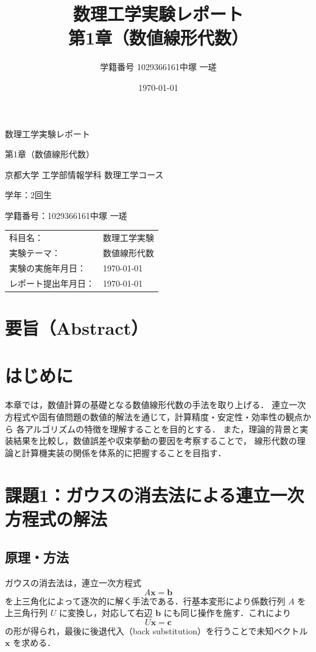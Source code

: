 \documentclass[a4paper,11pt]{ltjsarticle}
\title{数理工学実験レポート\\\vspace{5pt}\large 第1章（数値線形代数）}
\author{学籍番号 1029366161\quad 中塚 一瑳}
\date{\today}
\begin{document}
\begin{titlepage}
\centering
{\Large 数理工学実験レポート\par}
\vspace{4mm}
{\large 第1章（数値線形代数）\par}
\vspace{15mm}
{\large 京都大学 工学部情報学科 数理工学コース\par}
{\large 学年：2回生\par}
{\large 学籍番号：1029366161\quad 中塚 一瑳\par}
\vspace{10mm}
\begin{tabular}{@{}ll}
科目名： & 数理工学実験 \\
実験テーマ： & 数値線形代数 \\
実験の実施年月日： & \today \\
レポート提出年月日： & \today \\
\end{tabular}
\vfill
\end{titlepage}

\section*{要旨（Abstract）}


\section{はじめに}
本章では，数値計算の基礎となる数値線形代数の手法を取り上げる．
連立一次方程式や固有値問題の数値的解法を通じて，計算精度・安定性・効率性の観点から
各アルゴリズムの特徴を理解することを目的とする．
また，理論的背景と実装結果を比較し，数値誤差や収束挙動の要因を考察することで，
線形代数の理論と計算機実装の関係を体系的に把握することを目指す．


\section{課題1：ガウスの消去法による連立一次方程式の解法}

\subsection{原理・方法}
ガウスの消去法は，連立一次方程式
\[
A\boldsymbol{x} = \boldsymbol{b}
\]
を上三角化によって逐次的に解く手法である\cite{exp2025}．行基本変形により係数行列 $A$ を上三角行列 $U$ に変換し，対応して右辺 $\boldsymbol{b}$ にも同じ操作を施す．これにより
\[
U\boldsymbol{x} = \boldsymbol{c}
\]
の形が得られ，最後に後退代入（back substitution）を行うことで未知ベクトル $\boldsymbol{x}$ を求める．
\end{document}

